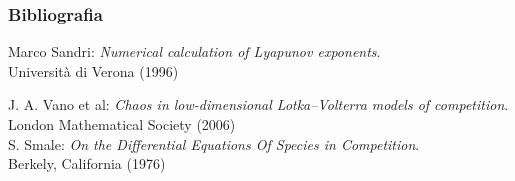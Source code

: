 \begin{frame}
\frametitle{Bibliografia}
\begin{thebibliography}{9}
    Marco Sandri: \textit{Numerical calculation of Lyapunov exponents}. \\
    Università di Verona (1996)

    J. A. Vano et al: \textit{Chaos in low-dimensional Lotka–Volterra models of competition}.\\
    London Mathematical Society (2006)\\ 

    S. Smale: \textit{On the Differential Equations Of Species in Competition}.\\
    Berkely, California (1976) 

\end{thebibliography}
\end{frame}
